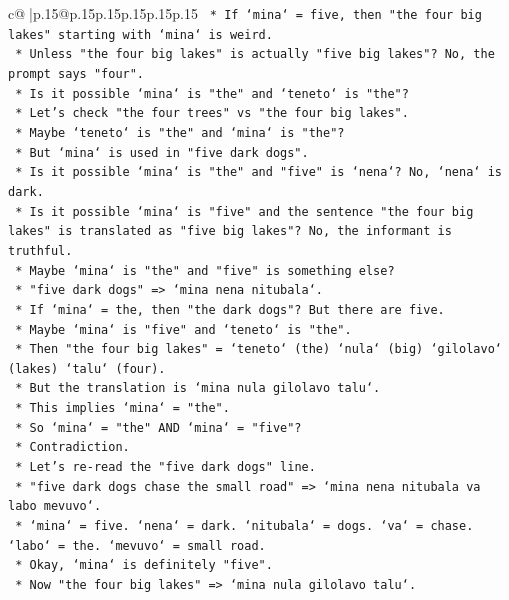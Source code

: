 \documentclass{article}
\begin{document}
{\begin{supertabular}{c@{$\;$}|p{.15\linewidth}@{}p{.15\linewidth}p{.15\linewidth}p{.15\linewidth}p{.15\linewidth}p{.15\linewidth}}
{{{\texttt{    *   If `mina` = five, then "the four big lakes" starting with `mina` is weird.} \\
\texttt{    *   Unless "the four big lakes" is actually "five big lakes"? No, the prompt says "four".} \\
\texttt{    *   Is it possible `mina` is "the" and `teneto` is "the"?} \\
\texttt{    *   Let's check "the four trees" vs "the four big lakes".} \\
\texttt{    *   Maybe `teneto` is "the" and `mina` is "the"?} \\
\texttt{    *   But `mina` is used in "five dark dogs".} \\
\texttt{    *   Is it possible `mina` is "the" and "five" is `nena`? No, `nena` is dark.} \\
\texttt{    *   Is it possible `mina` is "five" and the sentence "the four big lakes" is translated as "five big lakes"? No, the informant is truthful.} \\
\texttt{    *   Maybe `mina` is "the" and "five" is something else?} \\
\texttt{    *   "five dark dogs" => `mina nena nitubala`.} \\
\texttt{    *   If `mina` = the, then "the dark dogs"? But there are five.} \\
\texttt{    *   Maybe `mina` is "five" and `teneto` is "the".} \\
\texttt{    *   Then "the four big lakes" = `teneto` (the) `nula` (big) `gilolavo` (lakes) `talu` (four).} \\
\texttt{    *   But the translation is `mina nula gilolavo talu`.} \\
\texttt{    *   This implies `mina` = "the".} \\
\texttt{    *   So `mina` = "the" AND `mina` = "five"?} \\
\texttt{    *   Contradiction.} \\
\texttt{    *   Let's re{-}read the "five dark dogs" line.} \\
\texttt{    *   "five dark dogs chase the small road" => `mina nena nitubala va labo mevuvo`.} \\
\texttt{    *   `mina` = five. `nena` = dark. `nitubala` = dogs. `va` = chase. `labo` = the. `mevuvo` = small road.} \\
\texttt{    *   Okay, `mina` is definitely "five".} \\
\texttt{    *   Now "the four big lakes" => `mina nula gilolavo talu`.} \\
}}}
\end{supertabular}}
\end{document}
